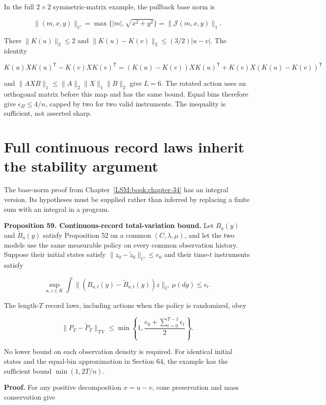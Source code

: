 In the full \(2\times2\) symmetric-matrix example, the pullback base
norm is

\[
\|(m,x,y)\|_C=\max\{|m|,\sqrt{x^2+y^2}\}=\|\mathcal J(m,x,y)\|_1.
\]

There \(\|K(u)\|_2\leq2\) and \(\|K(u)-K(v)\|_2\leq(3/2)|u-v|\). The
identity

\[
K(u)XK(u)^{\mathsf T}-K(v)XK(v)^{\mathsf T}
=(K(u)-K(v))XK(u)^{\mathsf T}
+K(v)X(K(u)-K(v))^{\mathsf T}
\]

and \(\|AXB\|_1\leq\|A\|_2\|X\|_1\|B\|_2\) give \(L=6\). The rotated
action uses an orthogonal matrix before this map and has the same bound.
Equal bins therefore give \(\epsilon_\Pi\leq4/n\), capped by two for two
valid instruments. The inequality is sufficient, not asserted sharp.

\section{Full continuous record laws inherit the stability argument}\label{LSM:full-continuous-record-laws-inherit-the-stability-argument}

The base-norm proof from Chapter~\ref{LSM:book:chapter-34} has an integral version. Its hypotheses
must be supplied rather than inferred by replacing a finite sum with an
integral in a program.

\textbf{Proposition 59. Continuous-record total-variation bound.} Let
\(B_a(y)\) and \(\widetilde B_a(y)\) satisfy Proposition 52 on a common
\((C,\lambda,\mu)\), and let the two models use the same measurable
policy on every common observation history. Suppose their initial states
satisfy \(\|z_0-\widetilde z_0\|_C\leq e_0\) and their time-\(t\)
instruments satisfy

\[
\sup_{a,z\in K}\int\|(B_{a,t}(y)-\widetilde B_{a,t}(y))z\|_C\,\mu(dy)
\leq\epsilon_t.
\]

The length-\(T\) record laws, including actions when the policy is
randomized, obey

\[
\boxed{
\|P_T-\widetilde P_T\|_{\mathrm{TV}}
\leq\min\left\{1,\frac{e_0+\sum_{t=0}^{T-1}\epsilon_t}{2}\right\}.
}
\]

No lower bound on each observation density is required. For identical
initial states and the equal-bin approximation in Section 64, the
example has the sufficient bound \(\min(1,2T/n)\).

\textbf{Proof.} For any positive decomposition \(x=u-v\), cone
preservation and mass conservation give

